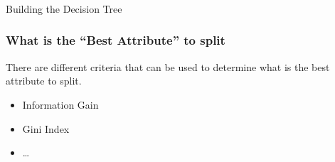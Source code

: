 


\begin{frame}[fragile]\frametitle{}
\begin{center}
{\Large Building the Decision Tree}
\end{center}
\end{frame}




\begin{frame}[fragile]\frametitle{What is the ``Best Attribute'' to split}
There are different criteria that can be used to determine what 
is the best attribute to split.
\begin{itemize}
\item Information Gain
\item Gini Index
\item \ldots
\end{itemize}
\end{frame}

